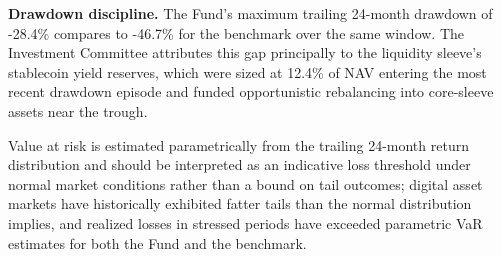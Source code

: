 \begin{thesisbox}
\textbf{Drawdown discipline.} The Fund's maximum trailing 24-month drawdown of -28.4\% compares to -46.7\% for the benchmark over the same window. The Investment Committee attributes this gap principally to the liquidity sleeve's stablecoin yield reserves, which were sized at 12.4\% of NAV entering the most recent drawdown episode and funded opportunistic rebalancing into core-sleeve assets near the trough.
\end{thesisbox}

Value at risk is estimated parametrically from the trailing 24-month return distribution and should be interpreted as an indicative loss threshold under normal market conditions rather than a bound on tail outcomes; digital asset markets have historically exhibited fatter tails than the normal distribution implies, and realized losses in stressed periods have exceeded parametric VaR estimates for both the Fund and the benchmark.
